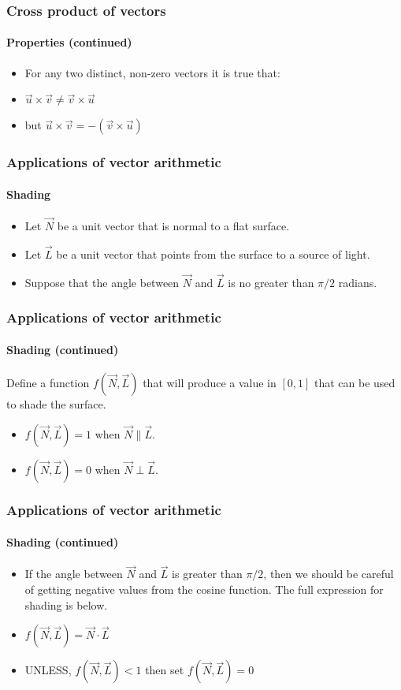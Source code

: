 \documentclass[xcolor=dvipsnames]{beamer}
\begin{document}
\begin{frame}
\frametitle{Cross product of vectors}
\framesubtitle{Properties (continued)}
  \begin{itemize}
  \item For any two distinct, non-zero vectors it is true that:
  \item $\vec{u} \times \vec{v} \neq \vec{v} \times \vec{u}$
  \item but $\vec{u} \times \vec{v} = - (\vec{v} \times \vec{u})$
  \end{itemize}
  \end{frame}

\begin{frame}
\frametitle{Applications of vector arithmetic}
\framesubtitle{Shading}

  \begin{itemize}  
    \item Let $\vec{N}$ be a unit vector that is normal to 
      a flat surface.
    \item Let $\vec{L}$ be a unit vector that points from
      the surface to a source of light.
    \item Suppose that the angle between $\vec{N}$ and $\vec{L}$
      is no greater than $\pi/2$ radians.
    \end{itemize}

  \end{frame}

\begin{frame}
\frametitle{Applications of vector arithmetic}
\framesubtitle{Shading (continued)}

  Define a function $f(\vec{N}, \vec{L})$ that
  will produce a value in $[0,1]$ that can be used to
  shade the surface.
  \begin{itemize}
    \item $f(\vec{N},\vec{L}) = 1$ when $\vec{N} \parallel \vec{L}$.
    \item $f(\vec{N},\vec{L}) = 0$ when $\vec{N} \perp \vec{L}$.
    \end{itemize}

  \end{frame}

\begin{frame}
\frametitle{Applications of vector arithmetic}
\framesubtitle{Shading (continued)}

  \begin{itemize}
    \item If the angle between $\vec{N}$ and
      $\vec{L}$ is greater than $\pi/2$, then we should be careful of getting negative values from the cosine function. The full expression for shading is below.

    \item $f(\vec{N},\vec{L}) = \vec{N} \cdot \vec{L}$
    \item UNLESS, $f(\vec{N},\vec{L}) < 1$ then set $f(\vec{N},\vec{L}) = 0$
  \end{itemize}

  \end{frame}
\end{document}
